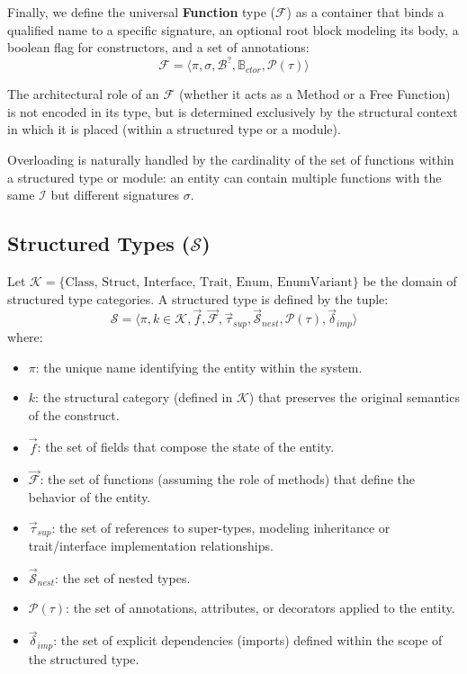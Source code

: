 Finally, we define the universal \textbf{Function} type
($\mathcal{F}$) as a container that binds a qualified name to a
specific signature, an optional root block modeling its body, a
boolean flag for constructors, and a set of annotations:
$$\mathcal{F} = \langle \pi, \sigma, \mathcal{B}^?,
\mathbb{B}_{ctor}, \mathcal{P}(\tau) \rangle$$

The architectural role of an $\mathcal{F}$ (whether it acts as a
Method or a Free Function) is not encoded in its type, but is
determined exclusively by the structural context in which it is
placed (within a structured type or a module).

Overloading is naturally handled by the cardinality of the set of
functions within a structured type or module: an entity can contain
multiple functions with the same $\mathcal{I}$ but different
signatures $\sigma$.

\subsection{Structured Types ($\mathcal{S}$)}
Let $\mathcal{K} = \{ \text{Class, Struct, Interface, Trait, Enum,
EnumVariant} \}$ be the domain of structured type categories. A
structured type is defined by the tuple:
$$\mathcal{S} = \langle \pi, k \in \mathcal{K}, \vec{f},
\vec{\mathcal{F}}, \vec{\tau}_{sup}, \vec{\mathcal{S}}_{nest},
\mathcal{P}(\tau), \vec{\delta}_{imp} \rangle$$
where:
\begin{itemize}
  \item $\pi$: the unique name identifying the entity within the system.
  \item $k$: the structural category (defined in $\mathcal{K}$) that
    preserves the original semantics of the construct.
  \item $\vec{f}$: the set of fields that compose the state of the entity.
  \item $\vec{\mathcal{F}}$: the set of functions (assuming the role
    of methods) that define the behavior of the entity.
  \item $\vec{\tau}_{sup}$: the set of references to super-types,
    modeling inheritance or trait/interface implementation relationships.
  \item $\vec{\mathcal{S}}_{nest}$: the set of nested types.
  \item $\mathcal{P}(\tau)$: the set of annotations, attributes, or
    decorators applied to the entity.
  \item $\vec{\delta}_{imp}$: the set of explicit dependencies
    (imports) defined within the scope of the structured type.
\end{itemize}

